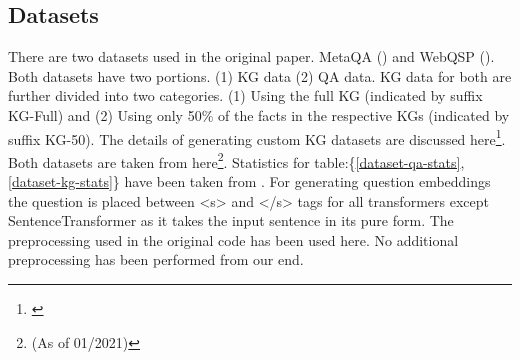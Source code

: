 \subsection{Datasets}\label{sec:datasets}

There are two datasets used in the original paper. MetaQA (\citep{metaqa-dataset}) and WebQSP (\citep{webqsp-dataset}). Both datasets have two portions. (1) KG data (2) QA data. KG data for both are further divided into two categories. (1) Using the full KG (indicated by suffix KG-Full) and (2) Using only 50\% of the facts in the respective KGs (indicated by suffix KG-50). The details of generating custom KG datasets are discussed here\footnote{\label{embedKGQAgit}\embedKGQAgit}. Both datasets are taken from here\footnote{\shareddatasetlink \hspace{.1cm} (As of 01/2021)}. Statistics for table:\{\ref{dataset-qa-stats}, \ref{dataset-kg-stats}\} have been taken from \citep{saxena-etal-2020-improving}. For generating question embeddings the question is placed between <s> and </s> tags for all transformers except SentenceTransformer as it takes the input sentence in its pure form. The preprocessing used in the original code has been used here. No additional preprocessing has been performed from our end. 

